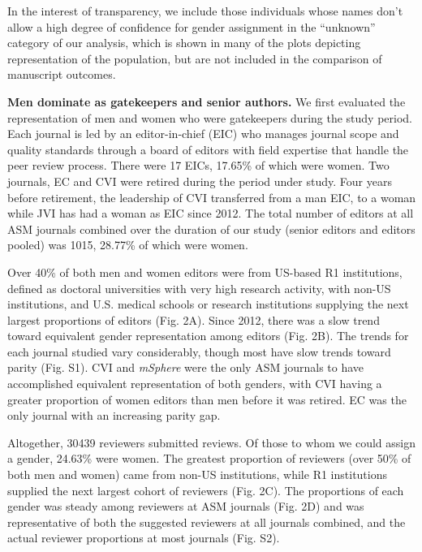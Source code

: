 \documentclass[11pt,]{article}
\begin{document}
In the interest of transparency, we include those individuals whose
names don't allow a high degree of confidence for gender assignment in
the ``unknown'' category of our analysis, which is shown in many of the
plots depicting representation of the population, but are not included
in the comparison of manuscript outcomes.

\textbf{Men dominate as gatekeepers and senior authors.} We first
evaluated the representation of men and women who were gatekeepers
during the study period. Each journal is led by an editor-in-chief (EIC)
who manages journal scope and quality standards through a board of
editors with field expertise that handle the peer review process. There
were 17 EICs, 17.65\% of which were women. Two journals, EC and CVI were
retired during the period under study. Four years before retirement, the
leadership of CVI transferred from a man EIC, to a woman while JVI has
had a woman as EIC since 2012. The total number of editors at all ASM
journals combined over the duration of our study (senior editors and
editors pooled) was 1015, 28.77\% of which were women.

Over 40\% of both men and women editors were from US-based R1
institutions, defined as doctoral universities with very high research
activity, with non-US institutions, and U.S. medical schools or research
institutions supplying the next largest proportions of editors (Fig.
2A). Since 2012, there was a slow trend toward equivalent gender
representation among editors (Fig. 2B). The trends for each journal
studied vary considerably, though most have slow trends toward parity
(Fig. S1). CVI and \emph{mSphere} were the only ASM journals to have
accomplished equivalent representation of both genders, with CVI having
a greater proportion of women editors than men before it was retired. EC
was the only journal with an increasing parity gap.

Altogether, 30439 reviewers submitted reviews. Of those to whom we could
assign a gender, 24.63\% were women. The greatest proportion of
reviewers (over 50\% of both men and women) came from non-US
institutions, while R1 institutions supplied the next largest cohort of
reviewers (Fig. 2C). The proportions of each gender was steady among
reviewers at ASM journals (Fig. 2D) and was representative of both the
suggested reviewers at all journals combined, and the actual reviewer
proportions at most journals (Fig. S2).
\end{document}
